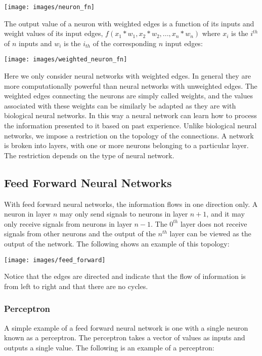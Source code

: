 \texttt{[image: images/neuron\_fn]}

The output value of a neuron with weighted edges is a function of its inputs and weight values of its input edges, $f(x_1 * w_1, x_2 * w_2, ..., x_n * w_n)$ where $x_i$ is the $i^{th}$ of $n$ inputs and $w_i$ is the $i_{th}$ of the corresponding $n$ input edges:

\texttt{[image: images/weighted\_neuron\_fn]}

Here we only consider neural networks with weighted edges. 
In general they are more computationally powerful than neural networks with unweighted edges.
The weighted edges connecting the neurons are simply called weights, and the values associated with these weights can be similarly be adapted as they are with biological neural networks. 
In this way a neural network can learn how to process the information presented to it based on past experience. 
Unlike biological neural networks, we impose a restriction on the topology of the connections.
A network is broken into layers, with one or more neurons belonging to a particular layer.
The restriction depends on the type of neural network.

\subsection{Feed Forward Neural Networks} 
With feed forward neural networks, the information flows in one direction only.
A neuron in layer $n$ may only send signals to neurons in layer $n+1$, and it may only receive signals from neurons in layer $n-1$.
The $0^{th}$ layer does not receive signals from other neurons and the output of the $n^{th}$ layer can be viewed as the output of the network.
The following shows an example of this topology:

\texttt{[image: images/feed\_forward]}

Notice that the edges are directed and indicate that the flow of information is from left to right and that there are no cycles.

\subsubsection{Perceptron}
A simple example of a feed forward neural network is one with a single neuron known as a perceptron.
The perceptron takes a vector of values as inputs and outputs a single value. 
The following is an example of a perceptron: 


